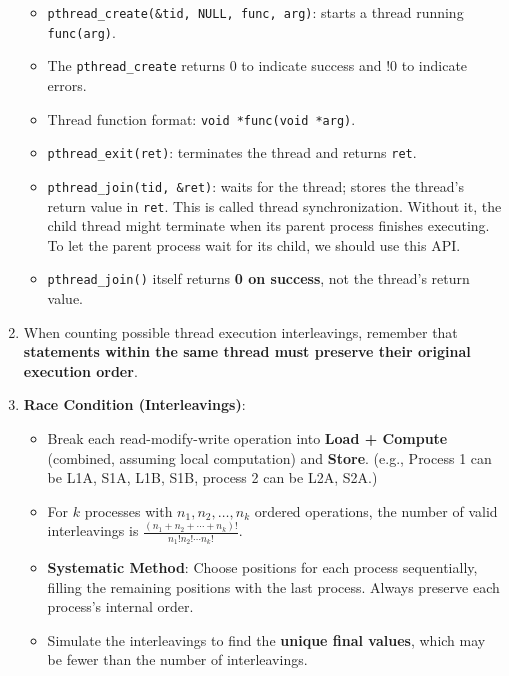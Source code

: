 \documentclass[10pt, landscape]{article}
\begin{document}
\begin{multicols}{4}
\begin{enumerate}
\begin{itemize}
        \item \texttt{pthread\_create(\&tid, NULL, func, arg)}: starts a thread running \texttt{func(arg)}.
        \item The \texttt{pthread\_create} returns 0 to indicate success and !0 to indicate errors.
        \item Thread function format: \texttt{void *func(void *arg)}.
        \item \texttt{pthread\_exit(ret)}: terminates the thread and returns \texttt{ret}.
        \item \texttt{pthread\_join(tid, \&ret)}: waits for the thread; stores the thread's return value in \texttt{ret}. This is called thread synchronization. Without it, the child thread might terminate when its parent process finishes executing. To let the parent process wait for its child, we should use this API.
        \item \texttt{pthread\_join()} itself returns \textbf{0 on success}, not the thread's return value.
    \end{itemize}
    \item When counting possible thread execution interleavings, remember that \textbf{statements within the same thread must preserve their original execution order}.
    \item \textbf{Race Condition (Interleavings)}:
    \begin{itemize}
        \item Break each read-modify-write operation into \textbf{Load + Compute} (combined, assuming local computation) and \textbf{Store}. (e.g., Process 1 can be L1A, S1A, L1B, S1B, process 2 can be L2A, S2A.)
        \item For $k$ processes with $n_1,n_2,\ldots,n_k$ ordered operations, the number of valid interleavings is $\frac{(n_1+n_2+\cdots+n_k)!}{n_1!n_2!\cdots n_k!}$.
        \item \textbf{Systematic Method}: Choose positions for each process sequentially, filling the remaining positions with the last process. Always preserve each process's internal order.
        \item Simulate the interleavings to find the \textbf{unique final values}, which may be fewer than the number of interleavings.
    \end{itemize}
\end{enumerate}


\end{multicols}
\end{document}
